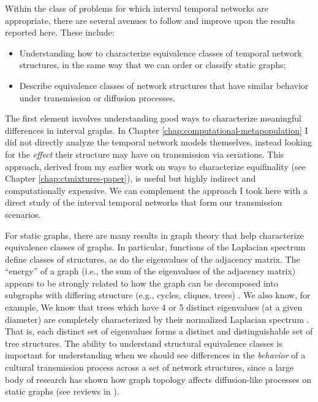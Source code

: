 Within the class of problems for which interval temporal networks are appropriate, there are several avenues to follow and improve upon the results reported here.  These include:

\begin{itemize}
    \item Understanding how to characterize equivalence classes of temporal network structures, in the same way that we can order or classify static graphs;
    \item Describe equivalence classes of network structures that have similar behavior under transmission or diffusion processes.
\end{itemize}

The first element involves understanding good ways to characterize meaningful differences in interval graphs.  In Chapter \ref{chap:computational-metapopulation} I did not directly analyze the temporal network models themselves, instead looking for the \emph{effect} their structure may have on transmission via seriations.  This approach, derived from my earlier work on ways to characterize equifinality (see Chapter \ref{chap:ctmixtures-paper}), is useful but highly indirect and computationally expensive.  We can complement the approach I took here with a direct study of the interval temporal networks that form our transmission scenarios.  

For static graphs, there are many results in graph theory that help characterize equivalence classes of graphs.  In particular, functions of the Laplacian spectrum define classes of structures, as do the eigenvalues of the adjacency matrix.  The ``energy'' of a graph (i.e., the sum of the eigenvalues of the adjacency matrix) appears to be strongly related to how the graph can be decomposed into subgraphs with differing structure (e.g., cycles, cliques, trees) \citep{estrada2017meaning,gutman2006laplacian}.  We also know, for example, We know that trees which have 4 or 5 distinct eigenvalues (at a given diameter) are completely characterized by their normalized Laplacian spectrum \citep{braga2015trees}.  That is, each distinct set of eigenvalues forms a distinct and distinguishable set of tree structures.  The ability to understand structural equivalence classes is important for understanding when we should see differences in the \emph{behavior} of a cultural transmission process across a set of network structures, since a large body of research has shown how graph topology affects diffusion-like processes on static graphs (see reviews in  \citealt{Castellano2006,Durrett2007,grimmett2018probability,szabo2007evolutionary}).

